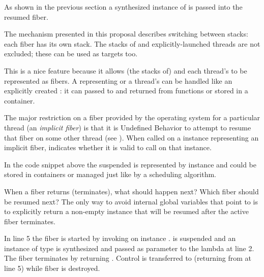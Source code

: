 
\label{representation}
As shown in the previous section a synthesized instance of \fiber is passed
into the resumed fiber.


The mechanism presented in this proposal describes switching between stacks: each
fiber has its own stack. The stacks of \main and explicitly-launched threads
are not excluded; these can be used as targets too.


This is a nice feature because it allows (the stacks of) \main and each
thread's \entryfn to be represented as fibers. A \fiber
representing \main or a thread's \entryfn can be handled like an
explicitly created \fiber: it can passed to and returned from functions or
stored in a container.

The major restriction on a fiber provided by the operating system for a particular thread (an \emph{implicit fiber}) is that it is Undefined Behavior to attempt to resume that fiber on some other thread (see ).
When called on a \fiber instance representing an implicit fiber, \canxtresume indicates
whether it is valid to call \xtresumesome on that instance.

In the code snippet above the suspended \main is represented by instance
 and could be stored in containers or managed just like 
by a scheduling algorithm.


 When a fiber returns (terminates), what
should happen next? Which fiber should be resumed next? The only way to avoid
internal global variables that point to \main is to explicitly return a non-empty
\fiber instance that will be resumed after the active fiber terminates.

In line 5 the fiber is started by invoking \resume on instance . \main
is suspended and an instance of type  is synthesized and passed as
parameter  to the lambda at line 2. The fiber terminates by returning
. Control is transferred to \main (returning from  at
line 5) while fiber  is destroyed.

